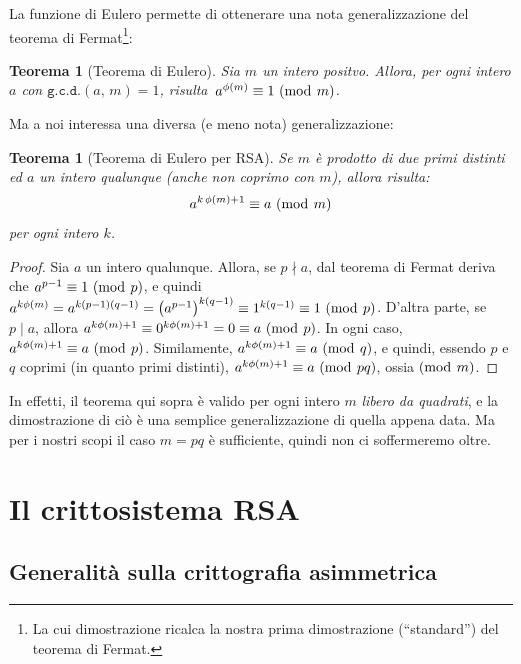 \documentclass[pdflatex,11pt,a4paper,oneside]{article}
\let\OldEmph\emph
\renewcommand{\emph}[1]{\OldEmph{#1\/}}
\newcommand{\p}[1]{\left({#1}\right)}
\newcommand{\ephi}[1]{\ensuremath{\phi\p{#1}}}
\newcommand{\divides}[0]{\mid}
\newcommand{\notdivides}[0]{\nmid}
\newcommand{\congruent}[0]{\equiv}
\newcommand{\mmodop}[0]{\ensuremath{\operatorname{mod}}}
\newcommand{\mmod}[1]{\ensuremath{\allowbreak\ (\mmodop\:{#1})}}
\newcommand{\gcdop}[0]{\ensuremath{\mathtt{g.c.d.}}}
\newcommand{\xgcd}[1]{\ensuremath{\gcdop\left({#1}\right)}}
\renewcommand{\gcd}[2]{\xgcd{{#1},\,{#2}}}
\newtheorem{theorem}[TheoremLike]{Teorema}
\begin{document}
La funzione di Eulero permette di ottenerare una nota generalizzazione
del teorema di Fermat\footnote{La cui dimostrazione ricalca la nostra
prima dimostrazione (``standard'') del teorema di Fermat.}:

\begin{theorem}[Teorema di Eulero]\label{thm:euler}
Sia $m$ un intero positvo. Allora, per ogni intero $a$ con
$\gcd{a}{m} = 1$, risulta\, $a^{\ephi{m}} \congruent 1 \mmod m$.
\end{theorem}

\noindent
Ma a noi interessa una diversa (e meno nota) generalizzazione:

\begin{theorem}[Teorema di Eulero per RSA]\label{thm:euler-rsa}
Se $m$ \`e prodotto di due primi \emph{distinti} ed $a$ un intero
qualunque (anche non coprimo con $m$), allora risulta:
  $$ a^{k\,\ephi{m} + 1} \congruent a \mmod m $$
per ogni intero $k$.
\end{theorem}
%
\begin{proof}
Sia $a$ un intero qualunque.  Allora, se $p \notdivides a$, dal teorema
di Fermat deriva che $a^{p-1} \congruent 1 \mmod p$, e quindi
$a^{k\ephi{m}} = a^{k(p-1)(q-1)} = {\p{a^{p-1}}}^{k(q-1)} \congruent
1^{k(q-1)} \congruent 1 \mmod p$.  D'altra parte, se $p \divides a$,
allora $a^{k\ephi{m} + 1} \congruent 0^{k\ephi{m} + 1} = 0 \congruent a
\mmod p$. In ogni caso, $a^{k\ephi{m} + 1} \congruent a \mmod p$.
Similamente, $a^{k\ephi{m} + 1} \congruent a \mmod q$, e quindi, essendo
$p$ e $q$ coprimi (in quanto primi distinti), $a^{k\ephi{m} + 1}
\congruent a \mmod{pq}$,
ossia$\mmod m$. %
\end{proof}

In effetti, il teorema qui sopra \`e valido per ogni intero $m$
\emph{libero da quadrati}, e la dimostrazione di ci\`o \`e una
semplice generalizzazione di quella appena data.  Ma per i nostri
scopi il caso $m = pq$ \`e sufficiente, quindi non ci soffermeremo
oltre.


\section{Il crittosistema RSA}

\subsection{Generalit\`a sulla crittografia asimmetrica}
\end{document}
